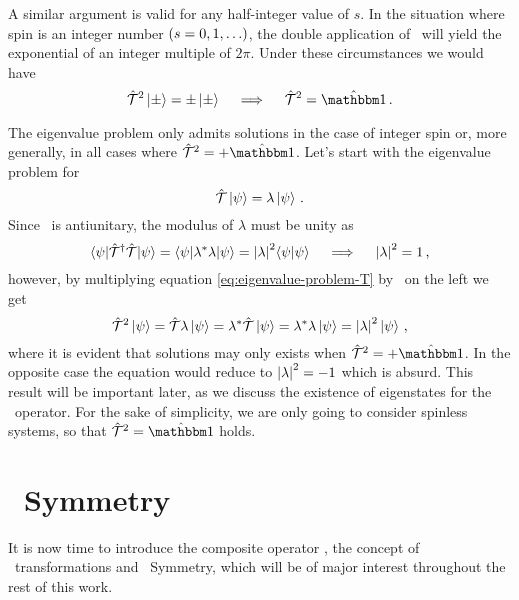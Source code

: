            A similar argument is valid for any half-integer value of $s$. In the situation where spin is an integer number $\pqty{s = 0,1,\ldots}$, the double application of \hK\ will yield the exponential of an integer multiple of $2\pi$. Under these circumstances we would have
            \begin{equation*}
                \hT^2 \ket{\pm} = \pm\ket{\pm}
                \quad\implies\quad
                \hT^2 = \togglehat{\idM}
                \myperiod
            \end{equation*}

            The eigenvalue problem only admits solutions in the case of integer spin or, more generally, in all cases where $\hT^2 = +\togglehat{\idM}$. Let's start with the eigenvalue problem for \hT
            \begin{equation}
                \label{eq:eigenvalue-problem-T}
                \mathcal{\hat{T}} \ket{\psi} = \lambda \ket{\psi}
                \,\text{.}
            \end{equation}
            Since \hT\ is antiunitary, the modulus of $\lambda$ must be unity as
            \begin{equation*}
                \bra{\psi}\!\mathcal{\hat{T}}^\dag \mathcal{\hat{T}} \!\ket{\psi}
                = \bra{\psi} \!\lambda^* \lambda\!\ket{\psi}
                = \abs{\lambda}^2 \!\braket{\psi}{\psi}
                \quad\implies\quad
                \abs{\lambda}^2 = 1
                \,\text{,}
            \end{equation*}
            however, by multiplying equation \eqref{eq:eigenvalue-problem-T} by \hT\ on the left we get
            \begin{equation*}
                \mathcal{\hat{T}}^2 \ket{\psi}
                = \mathcal{\hat{T}} \lambda \ket{\psi}
                = \lambda^* \mathcal{\hat{T}} \ket{\psi}
                = \lambda^* \lambda \ket{\psi}
                = \abs{\lambda}^2 \ket{\psi}
                \,\text{,}
            \end{equation*}
            where it is evident that solutions may only exists when $\hT^2 = +\togglehat{\idM}$. In the opposite case the equation would reduce to $\abs{\lambda}^2 = -1$ which is absurd. This result will be important later, as we discuss the existence of eigenstates for the \hPT\ operator. For the sake of simplicity, we are only going to consider spinless systems, so that $\hT^2 = \togglehat{\idM}$ holds.

    \section{\PT\ Symmetry}\label{s:pt-symmetry}
        It is now time to introduce the composite operator \hPT, the concept of \PT\ transformations and \PT\ Symmetry, which will be of major interest throughout the rest of this work.

